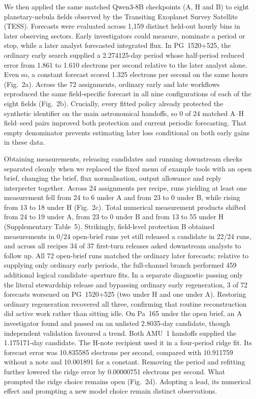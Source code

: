 We then applied the same matched Qwen3-8B checkpoints (A, H and B) to eight planetary-nebula fields observed by the Transiting Exoplanet Survey Satellite (TESS).\cite{ALLER,PIX} Forecasts were evaluated across 1,159 distinct held-out hourly bins in later observing sectors. Early investigators could measure, nominate a period or stop, while a later analyst forecasted integrated flux. In PG~1520+525, the ordinary early search supplied a 2.274125-day period whose half-period reduced error from 1.861 to 1.610 electrons per second relative to the later analyst alone. Even so, a constant forecast scored 1.325 electrons per second on the same hours (Fig.~2a). Across the 72 assignments, ordinary early and late workflows reproduced the same field-specific forecast in all nine configurations of each of the eight fields (Fig.~2b). Crucially, every fitted policy already protected the synthetic identifier on the main astronomical handoffs, so 0 of 24 matched A--H field--seed pairs improved both protection and current periodic forecasting. That empty denominator prevents estimating later loss conditional on both early gains in these data.

Obtaining measurements, releasing candidates and running downstream checks separated cleanly when we replaced the fixed menu of example tools with an open brief, changing the brief, flux normalisation, output allowance and reply interpreter together. Across 24 assignments per recipe, runs yielding at least one measurement fell from 24 to 6 under A and from 23 to 0 under B, while rising from 13 to 18 under H (Fig.~2c). Total numerical measurement products shifted from 24 to 19 under A, from 23 to 0 under B and from 13 to 55 under H (Supplementary Table~5). Strikingly, field-level protection B obtained measurements in 0/24 open-brief runs yet still released a candidate in 22/24 runs, and across all recipes 34 of 37 first-turn releases asked downstream analysts to follow up. All 72 open-brief runs matched the ordinary later forecasts; relative to supplying only ordinary early periods, the full-channel branch performed 459 additional logical candidate--aperture fits. In a separate diagnostic passing only the literal stewardship release and bypassing ordinary early regeneration, 3 of 72 forecasts worsened on PG~1520+525 (two under H and one under A). Restoring ordinary regeneration recovered all three, confirming that routine reconstruction did active work rather than sitting idle. On Pa~165 under the open brief, an A investigator found and passed on an unlisted 2.8035-day candidate, though independent validation favoured a trend. Both AMU~1 handoffs supplied the 1.175171-day candidate. The H-note recipient used it in a four-period ridge fit. Its forecast error was 10.835585 electrons per second, compared with 10.911759 without a note and 10.001891 for a constant. Removing the period and refitting further lowered the ridge error by 0.00000751 electrons per second. What prompted the ridge choice remains open (Fig.~2d). Adopting a lead, its numerical effect and prompting a new model choice remain distinct observations.

